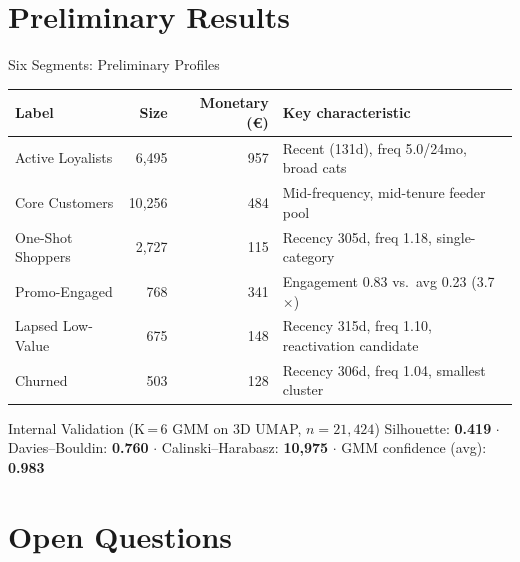 \documentclass[aspectratio=169,10pt]{beamer}
\begin{document}
\section{Preliminary Results}

\begin{frame}{Six Segments: Preliminary Profiles}
\centering\small
\begin{tabular}{@{}lrrp{5.8cm}@{}}
\toprule
\textbf{Label} & \textbf{Size} & \textbf{Monetary (\euro)} & \textbf{Key characteristic} \\
\midrule
Active Loyalists   & 6{,}495  & 957 & Recent (131d), freq 5.0/24mo, broad cats \\[2pt]
Core Customers     & 10{,}256 & 484 & Mid-frequency, mid-tenure feeder pool    \\[2pt]
One-Shot Shoppers  & 2{,}727  & 115 & Recency 305d, freq 1.18, single-category \\[2pt]
Promo-Engaged      & 768      & 341 & Engagement 0.83 vs.\ avg 0.23 (3.7$\times$) \\[2pt]
Lapsed Low-Value   & 675      & 148 & Recency 315d, freq 1.10, reactivation candidate \\[2pt]
Churned            & 503      & 128 & Recency 306d, freq 1.04, smallest cluster \\
\bottomrule
\end{tabular}

\vspace{0.5em}
\begin{block}{Internal Validation (K\,=\,6 GMM on 3D UMAP, $n=21{,}424$)}
\centering\small
Silhouette: \textbf{0.419} \;$\cdot$\;
Davies--Bouldin: \textbf{0.760} \;$\cdot$\;
Calinski--Harabasz: \textbf{10,975} \;$\cdot$\;
GMM confidence (avg): \textbf{0.983}
\end{block}
\end{frame}

\section{Open Questions}
\end{document}
